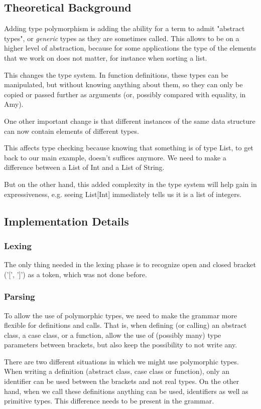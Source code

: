 \subsection{Theoretical Background}

Adding type polymorphism is adding the ability for a term to admit "abstract types", or \emph{generic} types as they are sometimes called. This allows to be on a higher level of abstraction, because for some applications the type of the elements that we work on does not matter, for instance when sorting a list.

This changes the type system. In function definitions, these types can be manipulated, but without knowing anything about them, so they can only be copied or passed further as arguments (or, possibly compared with equality, in Amy).

One other important change is that different instances of the same data structure can now contain elements of different types. 

This affects type checking because knowing that something is of type List, to get back to our main example, doesn't suffices anymore. We need to make a difference between a List of Int and a List of String.

But on the other hand, this added complexity in the type system will help gain in expressiveness, e.g. seeing List[Int] immediately tells us it is a list of integers.

\subsection{Implementation Details}
\subsubsection{Lexing}
The only thing needed in the lexing phase is to recognize open and closed bracket ('[', ']') as a token, which was not done before.
\subsubsection{Parsing}
To allow the use of polymorphic types, we need to make the grammar more flexible for definitions and calls. That is, when defining (or calling) an abstract class, a case class, or a function, allow the use of (possibly many) type parameters between brackets, but also keep the possibility to not write any. 

There are two different situations in which we might use polymorphic types. When writing a definition (abstract class, case class or function), only an identifier can be used between the brackets and not real types. On the other hand, when we call these definitions anything can be used, identifiers as well as primitive types. This difference needs to be present in the grammar.

